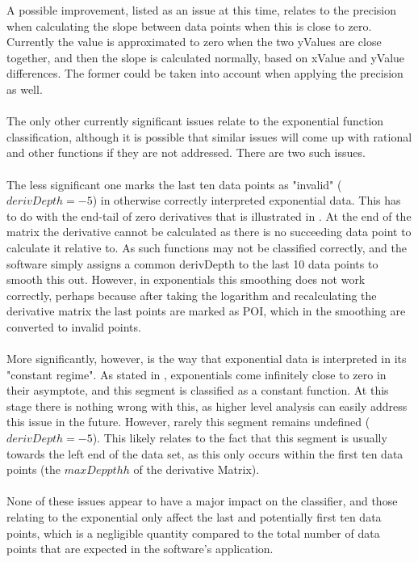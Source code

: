\documentclass[main.tex]{subfiles}
\begin{document}
    A possible improvement, listed as an issue at this time, relates to the precision when calculating the slope between data points when this is close to zero. Currently the value is approximated to zero when the two yValues are close together, and then the slope is calculated normally, based on xValue and yValue differences. The former could be taken into account when applying the precision as well.
    \\\\
    The only other currently significant issues relate to the exponential function classification, although it is possible that similar issues will come up with rational and other functions if they are not addressed. There are two such issues.
    \\\\
    The less significant one marks the last ten data points as "invalid" ($derivDepth=-5$) in otherwise correctly interpreted exponential data. This has to do with the end-tail  of zero derivatives that is illustrated in . At the end of the matrix the derivative cannot be calculated as there is no succeeding data point to calculate it relative to. As such functions may not be classified correctly, and the software simply assigns a common derivDepth to the last 10 data points to smooth this out. However, in exponentials this smoothing does not work correctly, perhaps because after taking the logarithm and recalculating the derivative matrix the last points are marked as POI, which in the smoothing are converted to invalid points.
    \\\\
    More significantly, however, is the way that exponential data is interpreted in its "constant regime". As stated in , exponentials come infinitely close to zero in their asymptote, and this segment is classified as a constant function. At this stage there is nothing wrong with this, as higher level analysis can easily address this issue in the future. However, rarely this segment remains undefined ($derivDepth=-5$). This likely relates to the fact that this segment is usually towards the left end of the data set, as this only occurs within the first ten data points (the $maxDeppthh$ of the derivative Matrix). 
    \\\\
    None of these issues appear to have a major impact on the classifier, and those relating to the exponential only affect the last and potentially first ten data points, which is a negligible quantity compared to the total number of data points that are expected in the software's application.
    
\end{document}
